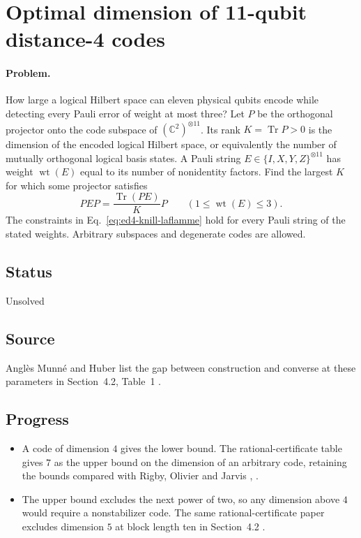 \section{Optimal dimension of 11-qubit distance-4 codes}
\label{sec:op_3ca7a14810280d8c}

\paragraph{Problem.}
How large a logical Hilbert space can eleven physical qubits encode while detecting every Pauli error of weight at most three? Let $P$ be the orthogonal projector onto the code subspace of $(\mathbb C^2)^{\otimes 11}$. Its rank $K=\operatorname{Tr}P>0$ is the dimension of the encoded logical Hilbert space, or equivalently the number of mutually orthogonal logical basis states. A Pauli string $E\in\{I,X,Y,Z\}^{\otimes 11}$ has weight $\operatorname{wt}(E)$ equal to its number of nonidentity factors. Find the largest $K$ for which some projector satisfies
\begin{equation}
PEP=\frac{\operatorname{Tr}(PE)}{K}P
\qquad(1\leq\operatorname{wt}(E)\leq3).
\label{eq:ed4-knill-laflamme}
\end{equation}
The constraints in Eq.~\eqref{eq:ed4-knill-laflamme} hold for every Pauli string of the stated weights. Arbitrary subspaces and degenerate codes are allowed.

\subsection*{Status}

Unsolved

\subsection*{Source}

Anglès Munné and Huber list the gap between construction and converse at these parameters in Section~4.2, Table~1 .

\subsection*{Progress}

\begin{itemize}
  \item A code of dimension $4$ gives the lower bound. The rational-certificate table gives $7$ as the upper bound on the dimension of an arbitrary code, retaining the bounds compared with Rigby, Olivier and Jarvis , .

  \item The upper bound excludes the next power of two, so any dimension above $4$ would require a nonstabilizer code. The same rational-certificate paper excludes dimension $5$ at block length ten in Section~4.2 .
\end{itemize}


